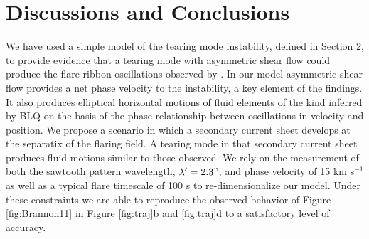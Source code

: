 \section{Discussions and Conclusions}
We have used a simple model of the tearing mode instability, defined in Section 2, to provide evidence that a tearing mode with asymmetric shear flow could produce the flare ribbon oscillations observed by \citet{Brannon2015}. In our model asymmetric shear flow provides a net phase velocity to the instability, a key element of the findings. It also produces elliptical horizontal motions of fluid elements of the kind inferred by BLQ on the basis of the phase relationship between oscillations in velocity and position.  We propose a scenario in which a secondary current sheet develops at the separatix of the flaring field.  A tearing mode in that secondary current sheet produces fluid motions similar to those observed.  We rely on the measurement of both the sawtooth pattern wavelength, $\lambda' =2.3"$, and  phase velocity of 15 km s$^{-1}$ as well as a typical flare timescale of 100 s to re-dimensionalize our model.  Under these constraints we are able to reproduce the observed behavior of Figure \ref{fig:Brannon11} in Figure \ref{fig:traj}b and \ref{fig:traj}d to a satisfactory level of accuracy. 



